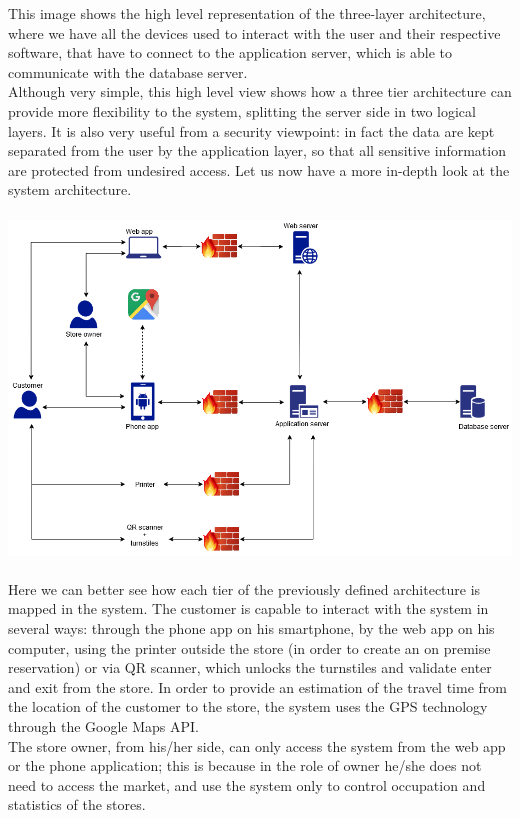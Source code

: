 This image shows the high level representation of the three-layer architecture, where we have all the devices used to interact with the user and their respective software, that have to connect to the application server, which is able to communicate with the database server.\\
Although very simple, this high level view shows how a three tier architecture can provide more flexibility to the system, splitting the server side in two logical layers. It is also very useful from a security viewpoint: in fact the data are kept separated from the user by the application layer, so that all sensitive information are protected from undesired access.
\newpage
Let us now have a more in-depth look at the system architecture.\\\\
\includegraphics[scale=0.5]{Images/System Architecture.png}\\\\
Here we can better see how each tier of the previously defined architecture is mapped in the system. The customer is capable to interact with the system in several ways: through the phone app on his smartphone, by the web app on his computer, using the printer outside the store (in order to create an on premise reservation) or via QR scanner, which unlocks the turnstiles and validate enter and exit from the store. In order to provide an estimation of the travel time from the location of the customer to the store, the system uses the GPS technology through the Google Maps API.\\
The store owner, from his/her side, can only access the system from the web app or the phone application; this is because in the role of owner he/she does not need to access the market, and use the system only to control occupation and statistics of the stores.\\
